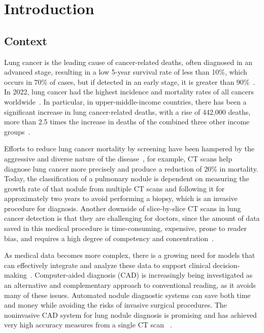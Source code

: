 \chapter{Introduction} \label{chap:intro}


\section{Context} \label{sec:context}

Lung cancer is the leading cause of cancer-related deaths, often diagnosed in an advanced stage, resulting in a low 5-year survival rate of less than 10\%, which occurs in 70\% of cases, but if detected in an early stage, it is greater than 90\%~\cite{bahmer_benefits_2011}. In 2022, lung cancer had the highest incidence and mortality rates of all cancers worldwide~\cite{gco_lung_2024}. In particular, in upper-middle-income countries, there has been a significant increase in lung cancer-related deaths, with a rise of 442,000 deaths, more than 2.5 times the increase in deaths of the combined three other income groups~\cite{who_death_cause_2024}.

Efforts to reduce lung cancer mortality by screening have been hampered by the aggressive and diverse nature of the disease~\cite{NLST}, for example, CT scans help diagnose lung cancer more precisely and produce a reduction of 20\% in mortality. Today, the classification of a pulmonary nodule is dependent on measuring the growth rate of that nodule from multiple CT scans and following it for approximately two years to avoid performing a biopsy, which is an invasive procedure for diagnosis. Another downside of slice-by-slice CT scans in lung cancer detection is that they are challenging for doctors, since the amount of data saved in this medical procedure is time-consuming, expensive, prone to reader bias, and requires a high degree of competency and concentration~\cite{Shaffie2022}.

As medical data becomes more complex, there is a growing need for models that can effectively integrate and analyze these data to support clinical decision-making~\cite{Iqbal2023}. Computer-aided diagnosis (CAD) is increasingly being investigated as an alternative and complementary approach to conventional reading, as it avoids many of these issues. Automated nodule diagnostic systems can save both time and money while avoiding the risks of invasive surgical procedures. The noninvasive CAD system for lung nodule diagnosis is promising and has achieved very high accuracy measures from a single CT scan ~\cite{Shaffie2022}.

